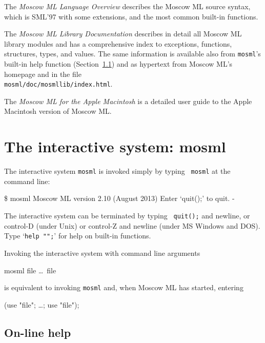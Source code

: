 \documentclass[fleqn,a4paper]{article}
\begin{document}
The {\em Moscow ML Language Overview\/}
\cite{MoscowML:2000:MoscowMLLanguage} describes the Moscow ML source
syntax, which is SML'97 with some extensions, and the most common
built-in functions.

The \emph{Moscow ML Library Documentation}
\cite{MoscowML:2000:MoscowMLLibrary} describes in detail all Moscow ML
library modules and has a comprehensive index to exceptions,
functions, structures, types, and values.  The same information is
available also from {\tt mosml}'s built-in help function
(Section~\ref{sec-mosml-help}) and as hypertext from Moscow ML's
homepage and in the file\\ \texttt{mosml/doc/mosmllib/index.html}.

The \emph{Moscow ML for the Apple Macintosh}
\cite{Currie:1999:MoscowMLMac} is a detailed user guide to the Apple
Macintosh version of Moscow ML\@.

\newpage

\section{The interactive system: mosml}
\label{sec-interactive-system}

The interactive system {\tt mosml} is invoked simply by typing {\tt
  mosml} at the command line:

\begin{program}
\$ mosml
Moscow ML version 2.10 (August 2013)
Enter `quit();' to quit.
- 
\end{program}

\noindent The interactive system can be terminated by typing {\tt
  quit();} and newline, or control-D (under Unix) or control-Z and
newline (under MS Windows and DOS).  Type `{\tt help "";}' for help on
built-in functions.

Invoking the interactive system with command line arguments

\begin{program}
mosml file \ldots\ file
\end{program}

\noindent is equivalent to invoking {\tt mosml} and, when Moscow ML
has started, entering

\begin{program}
(use "file"; \ldots; use "file");  
\end{program}


\subsection{On-line help}
\label{sec-mosml-help}
\end{document}
